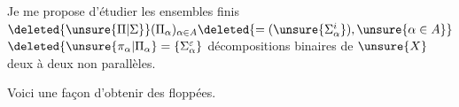 Je me propose d'étudier les ensembles finis  $\deleted{\unsure{\Pi|\Sigma}}(\Pi_\alpha)_{\alpha\in A}\deleted{=(\unsure{\Sigma_\alpha^i}),\unsure{\alpha\in A}}$
$\deleted{\unsure{\pi_\alpha|\Pi_\alpha}=\{\Sigma_\alpha^\varepsilon}$  décompositions binaires de $\unsure{X}$ deux à deux non parallèles.

Voici une façon   d'obtenir des floppées.
